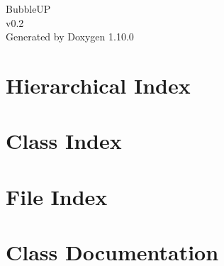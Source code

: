 \documentclass[twoside]{book}
\newcommand{\+}{\discretionary{\mbox{\scriptsize$\hookleftarrow$}}{}{}}
\newcommand{\clearemptydoublepage}{%
    \newpage{\pagestyle{empty}\cleardoublepage}%
  }
\begin{document}
  \raggedbottom
    \hypersetup{pageanchor=false,
                bookmarksnumbered=true,
                pdfencoding=unicode
               }
  \begin{titlepage}
  \vspace*{7cm}
  \begin{center}%
  {\Large Bubble\+UP}\\
  [1ex]\large v0.\+2 \\
  \vspace*{1cm}
  {\large Generated by Doxygen 1.10.0}\\
  \end{center}
  \end{titlepage}
  \clearemptydoublepage
  \tableofcontents
  \clearemptydoublepage
  \hypersetup{pageanchor=true}



\chapter{Hierarchical Index}

\chapter{Class Index}

\chapter{File Index}

\chapter{Class Documentation}


















































\end{document}
